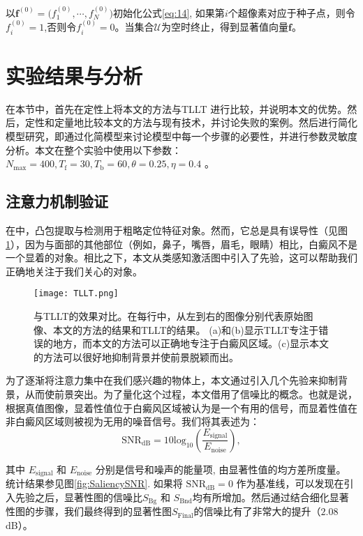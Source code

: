 以$\mathbf{f}^{(0)}=\Big (f_1^{(0)},\cdots,f_N^{(0)}\Big)$初始化公式\ref{eq:14}, 如果第$i$个超像素对应于种子点，则令$f_i^{(0)}=1$,否则令$f_i^{(0)}=0$。当集合$\mathcal{U}$为空时终止，得到显著值向量$\mathbf{f}$。

\section{实验结果与分析}
在本节中，首先在定性上将本文的方法与TLLT \cite {gong2015saliency}进行比较，并说明本文的优势。然后，定性和定量地比较本文的方法与现有技术，并讨论失败的案例。然后进行简化模型研究，即通过化简模型来讨论模型中每一个步骤的必要性，并进行参数灵敏度分析。本文在整个实验中使用以下参数：$ {N_\mathrm {max}} = 400, T_\mathrm {f} = 30, {T_ \mathrm {b}} = 60, \theta = 0.25, \eta = 0.4 $ 。


\subsection{注意力机制验证}
在\cite{gong2015saliency}中，凸包提取与检测用于粗略定位特征对象。然而，它总是具有误导性（见图 \ref {fig:TLLT}），因为与面部的其他部位（例如，鼻子，嘴唇，眉毛，眼睛）相比，白癜风不是一个显着的对象。相比之下，本文从类感知激活图中引入了先验，这可以帮助我们正确地关注于我们关心的对象。

\begin{figure}[htbp]
\begin{center}
\texttt{[image: TLLT.png]}
\end{center}
\caption{与TLLT的效果对比。在每行中，从左到右的图像分别代表原始图像、本文的方法的结果和TLLT的结果。 (a)和(b)显示TLLT专注于错误的地方，而本文的方法可以正确地专注于白癜风区域。(c)显示本文的方法可以很好地抑制背景并使前景脱颖而出。}
\label{fig:TLLT}
\end{figure}

为了逐渐将注意力集中在我们感兴趣的物体上，本文通过引入几个先验来抑制背景，从而使前景突出。为了量化这个过程，本文借用了信噪比的概念。也就是说，根据真值图像，显着性值位于白癜风区域被认为是一个有用的信号，而显着性值在非白癜风区域则被视为无用的噪音信号。我们将其表述为：
\begin{equation}
\label{eq:16}
\mathrm{SNR_{dB}}=10\mathrm{log_{10}}(\frac{E_{\mathrm{signal}}}{E_{\mathrm{noise}}}),
\end{equation}

其中 $E_\mathrm{signal}$ 和 $E_\mathrm{noise}$ 分别是信号和噪声的能量项, 由显著性值的均方差所度量。 统计结果参见图\ref{fig:SaliencySNR}. 如果将 $\mathrm{SNR_{dB}}=0$ 作为基准线，可以发现在引入先验之后，显著性图的信噪比$S_\mathrm{Bg}$ 和 $S_\mathrm{Bnd}$均有所增加。然后通过结合细化显著性图的步骤，我们最终得到的显著性图$S_\mathrm{Final}$的信噪比有了非常大的提升（$2.08$ dB）。
 
